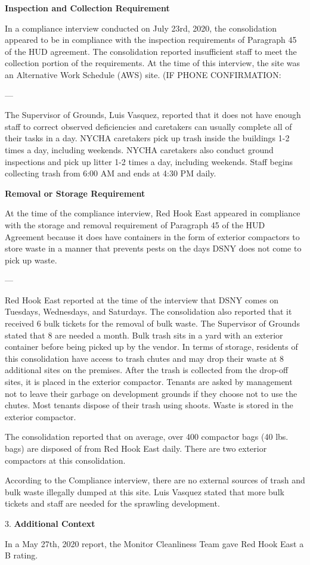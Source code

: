 

\textbf{Inspection and Collection Requirement}

In a compliance interview conducted on July 23rd, 2020, the consolidation appeared to be in compliance with the inspection requirements of Paragraph 45 of the HUD agreement. The consolidation reported insufficient staff to meet the collection portion of the requirements. At the time of this interview, the site was an Alternative Work Schedule (AWS) site. (IF PHONE CONFIRMATION: 

---

The Supervisor of Grounds, Luis Vasquez, reported that it does not have enough staff to correct observed deficiencies and caretakers can usually complete all of their tasks in a day. NYCHA caretakers pick up trash inside the buildings 1-2 times a day, including weekends. NYCHA caretakers also conduct ground inspections and pick up litter 1-2 times a day, including weekends. Staff begins collecting trash from 6:00 AM and ends at 4:30 PM daily. 

\textbf{Removal or Storage Requirement}

At the time of the compliance interview, Red Hook East appeared in compliance with the storage and removal requirement of Paragraph 45 of the HUD Agreement because it does have containers in the form of exterior compactors to store waste in a manner that prevents pests on the days DSNY does not come to pick up waste. 

---

Red Hook East reported at the time of the interview that DSNY comes on Tuesdays, Wednesdays, and Saturdays. The consolidation also reported that it received 6 bulk tickets for the removal of bulk waste. The Supervisor of Grounds stated that 8 are needed a month. Bulk trash sits in a yard with an exterior container before being picked up by the vendor. In terms of storage, residents of this consolidation have access to trash chutes and may drop their waste at 8 additional sites on the premises. After the trash is collected from the drop-off sites, it is placed in the exterior compactor. Tenants are asked by management not to leave their garbage on development grounds if they choose not to use the chutes. Most tenants dispose of their trash using shoots. Waste is stored in the exterior compactor. 

The consolidation reported that on average, over 400 compactor bags (40 lbs. bags) are disposed of from Red Hook East daily. There are two exterior compactors at this consolidation.

According to the Compliance interview, there are no external sources of trash and bulk waste illegally dumped at this site. Luis Vasquez stated that more bulk tickets and staff are needed for the sprawling development.  

3. \textbf{Additional Context}

In a May 27th, 2020 report, the Monitor Cleanliness Team gave Red Hook East a B rating. 